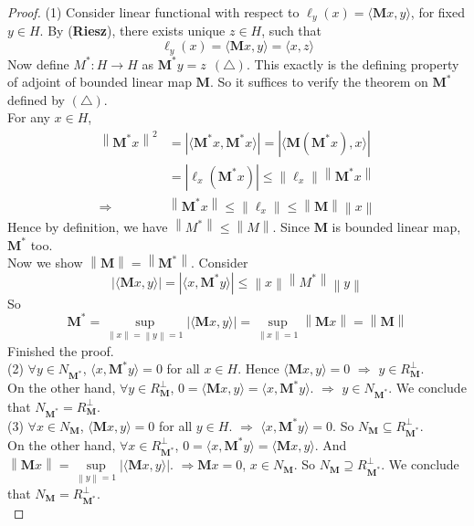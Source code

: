 \documentclass[a4paper, 10pt]{article}
\theoremstyle{definition}
\theoremstyle{hSol}
\begin{document}
\begin{proof} (1) Consider linear functional with respect to $\ell_y(x)=\langle \bm{M}x, y \rangle$, for fixed $y\in H$. By (\textbf{Riesz}), there exists unique $z\in H$, such that
$$
\ell_y(x) = \langle \bm{M}x, y \rangle = \langle x, z \rangle
$$
Now define $M^*: H\to H$ as $\bm{M}^*y = z~~(\triangle)$. This exactly is the defining property of adjoint of bounded linear map $\bm{M}$. So it suffices to verify the theorem on $\bm{M}^*$ defined by $(\triangle)$. \\
For any $x\in H$, 
\begin{equation}
	\begin{split}
		\left\|\bm{M}^*x\right\|^2 &= |\langle \bm{M}^*x, \bm{M}^*x \rangle|  = |\langle \bm{M}(\bm{M}^*x), x \rangle| \\
		&= |\ell_x(\bm{M}^* x)| \leq \left\|\ell_x\right\| \left\|\bm{M}^* x\right\| \\
		\Rightarrow & \left\|\bm{M}^*x\right\| \leq \left\|\ell_x\right\| \leq \left\|\bm{M}\right\| \left\|x\right\|
	\end{split}
\end{equation}
Hence by definition, we have $\left\|M^*\right\| \leq \left\|M\right\|$. Since $\bm{M}$ is bounded linear map, $\bm{M}^*$ too. \\
Now we show $\left\|\bm{M}\right\|= \left\|\bm{M}^*\right\|$. Consider
\begin{equation}
	|\langle \bm{M}x, y \rangle| = |\langle x, \bm{M}^*y \rangle| \leq \left\|x\right\| \left\|M^*\right\| \left\|y\right\|
\end{equation}
So 
$$
\bm{M}^* = \sup\limits_{\left\|x\right\|=\left\|y\right\|=1} |\langle \bm{M}x, y\rangle| = \sup\limits_{\left\|x\right\|=1} \left\|\bm{M}x\right\| = \left\|\bm{M}\right\|
$$
Finished the proof. \\
(2) $\forall y\in N_{\bm{M}^*}$, $\langle x, \bm{M}^*y \rangle=0$ for all $x\in H$. Hence $\langle \bm{M}x, y \rangle=0$ $\Rightarrow$ $y\in R^{\bot}_{\bm{M}}$. \\
On the other hand, $\forall y\in R_{\bm{M}}^{\bot}$, $0=\langle \bm{M}x, y \rangle=\langle x, \bm{M}^*y \rangle$. $\Rightarrow$ $y\in  N_{\bm{M}^*}$. We conclude that $N_{\bm{M}^*}=R_{\bm{M}}^{\bot}$. \\
(3) $\forall x\in N_{\bm{M}}$, $\langle \bm{M}x, y \rangle=0$ for all $y\in H$. $\Rightarrow$ $\langle x, \bm{M}^*y \rangle=0$. So $N_{\bm{M}}\subseteq R^{\bot}_{\bm{M}^*}$. \\
On the other hand, $\forall x\in R_{\bm{M}^*}^{\bot}$, $0=\langle x, \bm{M}^*y \rangle=\langle \bm{M}x, y \rangle$. And $\left\|\bm{M}x\right\|=\sup\limits_{\left\|y\right\|=1}|\langle \bm{M}x, y \rangle|$. $\Rightarrow \bm{M}x=0$, $x\in N_{\bm{M}}$. So $N_{\bm{M}}\supseteq R^{\bot}_{\bm{M}^*}$. We conclude that $N_{\bm{M}}=R_{\bm{M}^*}^{\bot}$. \\

\end{proof}
\end{document}
